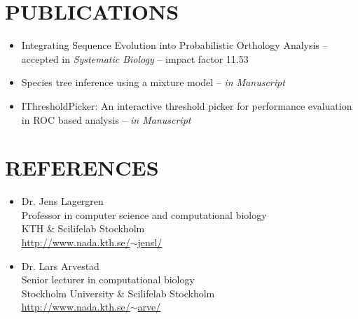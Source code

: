 \documentclass[margin, 10pt]{res} %
\begin{document}
\begin{resume}
\section{PUBLICATIONS} 
\begin{itemize}
\item Integrating Sequence Evolution into Probabilistic Orthology Analysis -- accepted in {\sl Systematic Biology} -- impact factor 11.53
\item Species tree inference using a mixture model -- {\sl in Manuscript}
\item IThresholdPicker: An interactive threshold picker for performance evaluation in ROC based analysis -- {\sl in Manuscript}

\end{itemize}



\section{REFERENCES} 
\begin{itemize}
\item Dr. Jens Lagergren \\
Professor in computer science and computational biology \\
KTH \& Scilifelab Stockholm \\
\href{http://www.nada.kth.se/~jensl/}{http://www.nada.kth.se/$\sim$jensl/} 

\item Dr. Lars Arvestad \\
Senior lecturer in computational biology \\
Stockholm University \& Scilifelab Stockholm \\
\hfill \href{http://www.nada.kth.se/~arve/}{http://www.nada.kth.se/$\sim$arve/}
\end{itemize}


\end{resume}
\end{document}
